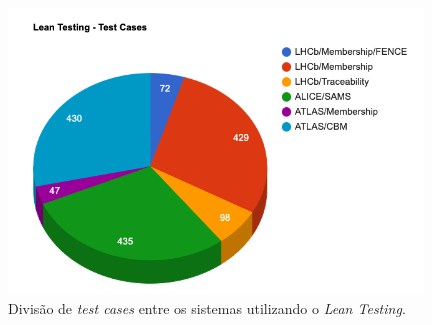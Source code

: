 \begin{figure}[H]
    \centering
    \includegraphics[width=11cm]{source/5-resultados/images/lean-testing.png}
    \caption{Divisão de \emph{test cases} entre os sistemas utilizando o \emph{Lean Testing}.}
    \label{fig:lean-testing}
\end{figure}
